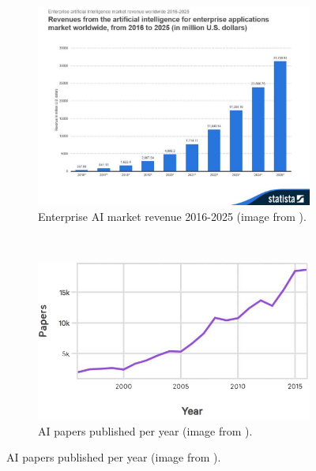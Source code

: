 \begin{figure}[!ht]
   \centering
   \begin{subfigure}[b]{0.5\textwidth}
       \includegraphics[width=\textwidth]{figures/ai-projections.jpg}
       \caption{Enterprise AI market revenue 2016-2025 (image from \cite{ai-proj}).}
       \label{fig:ai-proj}
   \end{subfigure}%
   ~ %
   \begin{subfigure}[b]{0.5\textwidth}
       \includegraphics[width=\textwidth]{figures/ai-papers.png}
       \caption{AI papers published per year (image from \cite{ai-papers}).}
       \label{fig:ai-papers}
   \end{subfigure}
\end{figure}

